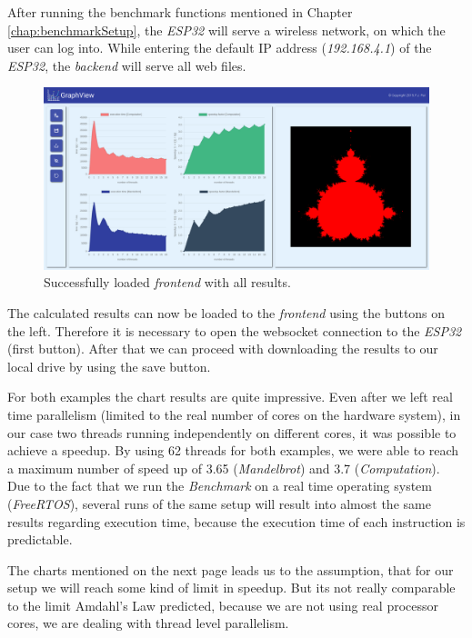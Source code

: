 After running the benchmark functions mentioned in Chapter \ref{chap:benchmarkSetup}, the \textit{ESP32} will serve a wireless network, on which the user can log into. While entering the default IP address (\textit{192.168.4.1}) of the \textit{ESP32}, the \textit{backend} will serve all web files. 

\begin{figure}[htbp]
	\centerline{\includegraphics[width=0.95\linewidth]{images/demo.jpg}}
	\caption{ Successfully loaded \textit{frontend} with all results. }
	\label{fig:frontendResults}
\end{figure}  

The calculated results can now be loaded to the \textit{frontend} using the buttons on the left. Therefore it is necessary to open the websocket connection to the \textit{ESP32} (first button). After that we can proceed with downloading the results to our local drive by using the save button.

For both examples the chart results are quite impressive. Even after we left real time parallelism (limited to the real number of cores on the hardware system), in our case two threads running independently on different cores, it was possible to achieve a speedup. By using 62 threads for both examples, we were able to reach a maximum number of speed up of 3.65 (\textit{Mandelbrot}) and 3.7 (\textit{Computation}). Due to the fact that we run the \textit{Benchmark} on a real time operating system (\textit{FreeRTOS}), several runs of the same setup will result into almost the same results regarding execution time, because the execution time of each instruction is predictable.

The charts mentioned on the next page leads us to the assumption, that for our setup we will reach some kind of limit in speedup. But its not really comparable to the limit Amdahl's Law predicted, because we are not using real processor cores, we are dealing with thread level parallelism.


